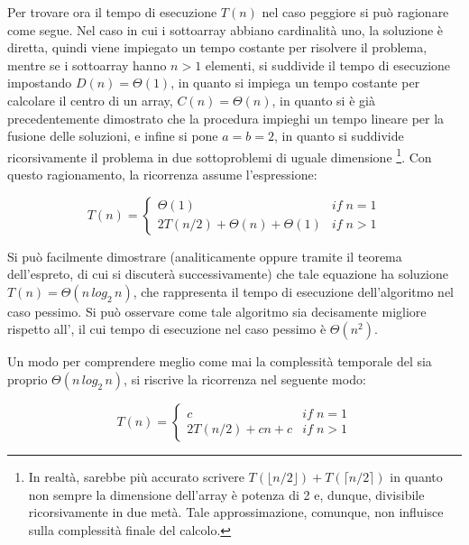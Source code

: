 Per trovare ora il tempo di esecuzione \(T(n)\) nel caso peggiore si può ragionare come segue. Nel caso in cui i sottoarray abbiano cardinalità uno, la soluzione è diretta, quindi viene impiegato un tempo costante per risolvere il problema, mentre se i sottoarray hanno \(n > 1\) elementi, si suddivide il tempo di esecuzione impostando \(D(n) = \Theta(1)\), in quanto si impiega un tempo costante per calcolare il centro di un array, \(C(n)=\Theta(n)\), in quanto si è già precedentemente dimostrato che la procedura  impieghi un tempo lineare per la fusione delle soluzioni, e infine si pone \(a=b=2\), in quanto si suddivide ricorsivamente il problema in due sottoproblemi di uguale dimensione \footnote{In realtà, sarebbe più accurato scrivere \(T(\lfloor n/2 \rfloor) + T(\lceil n/2 \rceil)\) in quanto non sempre la dimensione dell'array  è potenza di 2 e, dunque, divisibile ricorsivamente in due metà. Tale approssimazione, comunque, non influisce sulla complessità finale del calcolo.}. Con questo ragionamento, la ricorrenza assume l'espressione:

\begin{equation*}
  T(n)=\begin{cases}
    \Theta(1) & if\; n=1\\
    2T(n/2)+\Theta(n)+\Theta(1) & if\; n>1
  \end{cases}
\end{equation*}

Si può facilmente dimostrare (analiticamente oppure tramite il teorema dell'espreto, di cui si discuterà successivamente) che tale equazione ha soluzione \(T(n)=\Theta(n\,log_2\,n)\), che rappresenta il tempo di esecuzione dell'algoritmo  nel caso pessimo. Si può osservare come tale algoritmo sia decisamente migliore rispetto all', il cui tempo di esecuzione nel caso pessimo è \(\Theta(n^2)\).

Un modo per comprendere meglio come mai la complessità temporale del  sia proprio \(\Theta(n\,log_2\,n)\), si riscrive la ricorrenza nel seguente modo:

\begin{equation*}
  T(n)=\begin{cases}
    c & if\; n=1\\
    2T(n/2)+cn+c & if\; n>1
  \end{cases}
\end{equation*}

